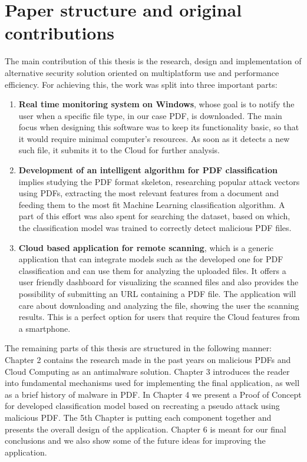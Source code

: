 \section{Paper structure and original contributions}
\label{section:structure}
The main contribution of this thesis is the research, design and implementation of alternative security solution oriented on multiplatform use and performance efficiency. For achieving this, the work was split into three important parts:
\begin{enumerate}
    \item \textbf{Real time monitoring system on Windows}, whose goal is to notify the user when a specific file type, in our case PDF, is downloaded. The main focus when designing this software was to keep its functionality basic, so that it would require minimal computer's resources. As soon as it detects a new such file, it submits it to the Cloud for further analysis.
    \item \textbf{Development of an intelligent algorithm for PDF classification} implies studying the PDF format skeleton, researching popular attack vectors using PDFs, extracting the most relevant features from a document and feeding them to the most fit Machine Learning classification algorithm. A part of this effort was also spent for searching the dataset, based on which, the classification model was trained to correctly detect malicious PDF files.
    \item \textbf{Cloud based application for remote scanning}, which is a generic application that can integrate models such as the developed one for PDF classification and can use them for analyzing the uploaded files. It offers a user friendly dashboard for visualizing the scanned files and also provides the possibility of submitting an URL containing a PDF file. The application will care about downloading and analyzing the file, showing the user the scanning results. This is a perfect option for users that require the Cloud features from a smartphone.
\end{enumerate}

The remaining parts of this thesis are structured in the following manner: Chapter 2 contains the research made in the past years on malicious PDFs and Cloud Computing as an antimalware solution. Chapter 3 introduces the reader into fundamental mechanisms used for implementing the final application, as well as a brief history of malware in PDF. In Chapter 4 we present a Proof of Concept for developed classification model based on recreating a pseudo attack using malicious PDF. The 5th Chapter is putting each component together and presents the overall design of the application. Chapter 6 is meant for our final conclusions and we also show some of the future ideas for improving the application.

